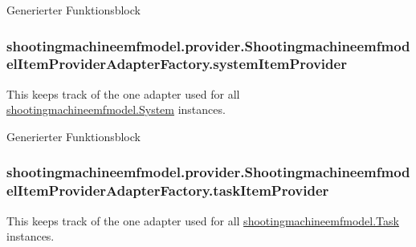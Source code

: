 Generierter Funktionsblock \hypertarget{classshootingmachineemfmodel_1_1provider_1_1_shootingmachineemfmodel_item_provider_adapter_factory_a0bf6dc3202dfa65a30a0b9ac9a5f24b9}{
\subsubsection[{system\-Item\-Provider}]{ shootingmachineemfmodel.\-provider.\-Shootingmachineemfmodel\-Item\-Provider\-Adapter\-Factory.\-system\-Item\-Provider\hspace{0.3cm}{\ttfamily [protected]}}}\label{classshootingmachineemfmodel_1_1provider_1_1_shootingmachineemfmodel_item_provider_adapter_factory_a0bf6dc3202dfa65a30a0b9ac9a5f24b9}
This keeps track of the one adapter used for all \hyperlink{interfaceshootingmachineemfmodel_1_1_system}{shootingmachineemfmodel.\-System} instances.

Generierter Funktionsblock \hypertarget{classshootingmachineemfmodel_1_1provider_1_1_shootingmachineemfmodel_item_provider_adapter_factory_a613779bbd8c39fdae4027b22f1b63670}{
\subsubsection[{task\-Item\-Provider}]{ shootingmachineemfmodel.\-provider.\-Shootingmachineemfmodel\-Item\-Provider\-Adapter\-Factory.\-task\-Item\-Provider\hspace{0.3cm}{\ttfamily [protected]}}}\label{classshootingmachineemfmodel_1_1provider_1_1_shootingmachineemfmodel_item_provider_adapter_factory_a613779bbd8c39fdae4027b22f1b63670}
This keeps track of the one adapter used for all \hyperlink{interfaceshootingmachineemfmodel_1_1_task}{shootingmachineemfmodel.\-Task} instances.

